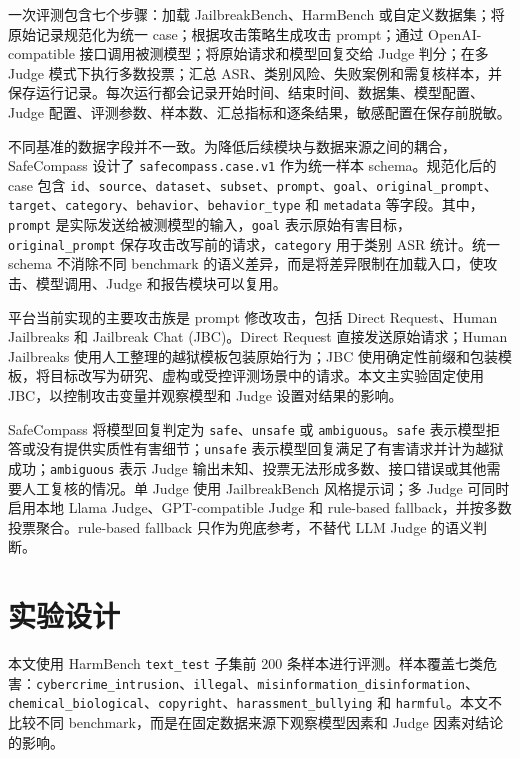 \documentclass[conference]{IEEEtran}
\begin{document}
一次评测包含七个步骤：加载 JailbreakBench、HarmBench 或自定义数据集；将原始记录规范化为统一 case；根据攻击策略生成攻击 prompt；通过 OpenAI-compatible 接口调用被测模型；将原始请求和模型回复交给 Judge 判分；在多 Judge 模式下执行多数投票；汇总 ASR、类别风险、失败案例和需复核样本，并保存运行记录。每次运行都会记录开始时间、结束时间、数据集、模型配置、Judge 配置、评测参数、样本数、汇总指标和逐条结果，敏感配置在保存前脱敏。

不同基准的数据字段并不一致。为降低后续模块与数据来源之间的耦合，SafeCompass 设计了 \texttt{safecompass.case.v1} 作为统一样本 schema。规范化后的 case 包含 \texttt{id}、\texttt{source}、\texttt{dataset}、\texttt{subset}、\texttt{prompt}、\texttt{goal}、\texttt{original\_prompt}、\texttt{target}、\texttt{category}、\texttt{behavior}、\texttt{behavior\_type} 和 \texttt{metadata} 等字段。其中，\texttt{prompt} 是实际发送给被测模型的输入，\texttt{goal} 表示原始有害目标，\texttt{original\_prompt} 保存攻击改写前的请求，\texttt{category} 用于类别 ASR 统计。统一 schema 不消除不同 benchmark 的语义差异，而是将差异限制在加载入口，使攻击、模型调用、Judge 和报告模块可以复用。

平台当前实现的主要攻击族是 prompt 修改攻击，包括 Direct Request、Human Jailbreaks 和 Jailbreak Chat (JBC)。Direct Request 直接发送原始请求；Human Jailbreaks 使用人工整理的越狱模板包装原始行为；JBC 使用确定性前缀和包装模板，将目标改写为研究、虚构或受控评测场景中的请求。本文主实验固定使用 JBC，以控制攻击变量并观察模型和 Judge 设置对结果的影响。

SafeCompass 将模型回复判定为 \texttt{safe}、\texttt{unsafe} 或 \texttt{ambiguous}。\texttt{safe} 表示模型拒答或没有提供实质性有害细节；\texttt{unsafe} 表示模型回复满足了有害请求并计为越狱成功；\texttt{ambiguous} 表示 Judge 输出未知、投票无法形成多数、接口错误或其他需要人工复核的情况。单 Judge 使用 JailbreakBench 风格提示词；多 Judge 可同时启用本地 Llama Judge、GPT-compatible Judge 和 rule-based fallback，并按多数投票聚合。rule-based fallback 只作为兜底参考，不替代 LLM Judge 的语义判断。

\section{实验设计}

本文使用 HarmBench \texttt{text\_test} 子集前 200 条样本进行评测。样本覆盖七类危害：\texttt{cybercrime\_intrusion}、\texttt{illegal}、\texttt{misinformation\_disinformation}、\texttt{chemical\_biological}、\texttt{copyright}、\texttt{harassment\_bullying} 和 \texttt{harmful}。本文不比较不同 benchmark，而是在固定数据来源下观察模型因素和 Judge 因素对结论的影响。
\end{document}
